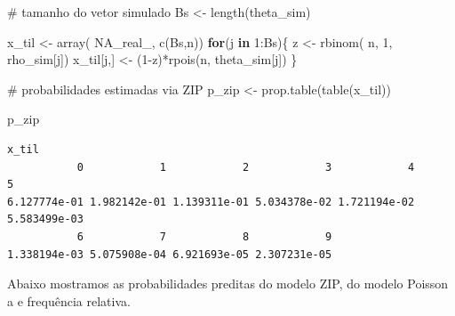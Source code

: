 \documentclass[
  letterpaper,
  DIV=11,
  numbers=noendperiod]{scrreprt}
\newenvironment{Shaded}{\begin{snugshade}}{\end{snugshade}}
\newcommand{\CommentTok}[1]{\textcolor[rgb]{0.37,0.37,0.37}{#1}}
\newcommand{\ConstantTok}[1]{\textcolor[rgb]{0.56,0.35,0.01}{#1}}
\newcommand{\ControlFlowTok}[1]{\textcolor[rgb]{0.00,0.23,0.31}{\textbf{#1}}}
\newcommand{\DecValTok}[1]{\textcolor[rgb]{0.68,0.00,0.00}{#1}}
\newcommand{\FunctionTok}[1]{\textcolor[rgb]{0.28,0.35,0.67}{#1}}
\newcommand{\NormalTok}[1]{\textcolor[rgb]{0.00,0.23,0.31}{#1}}
\newcommand{\OtherTok}[1]{\textcolor[rgb]{0.00,0.23,0.31}{#1}}
\newcommand{\SpecialCharTok}[1]{\textcolor[rgb]{0.37,0.37,0.37}{#1}}
\theoremstyle{definition}
\theoremstyle{definition}
\theoremstyle{plain}
\theoremstyle{remark}
\begin{document}
\begin{Shaded}
\begin{Highlighting}[]
\CommentTok{\# tamanho do vetor simulado}
\NormalTok{Bs }\OtherTok{\textless{}{-}} \FunctionTok{length}\NormalTok{(theta\_sim)}

\NormalTok{x\_til }\OtherTok{\textless{}{-}} \FunctionTok{array}\NormalTok{( }\ConstantTok{NA\_real\_}\NormalTok{, }\FunctionTok{c}\NormalTok{(Bs,n))}
\ControlFlowTok{for}\NormalTok{(j }\ControlFlowTok{in} \DecValTok{1}\SpecialCharTok{:}\NormalTok{Bs)\{}
\NormalTok{  z }\OtherTok{\textless{}{-}} \FunctionTok{rbinom}\NormalTok{( n, }\DecValTok{1}\NormalTok{, rho\_sim[j])}
\NormalTok{  x\_til[j,] }\OtherTok{\textless{}{-}}\NormalTok{ (}\DecValTok{1}\SpecialCharTok{{-}}\NormalTok{z)}\SpecialCharTok{*}\FunctionTok{rpois}\NormalTok{(n, theta\_sim[j])}
\NormalTok{\}}

\CommentTok{\# probabilidades estimadas via ZIP}
\NormalTok{p\_zip }\OtherTok{\textless{}{-}} \FunctionTok{prop.table}\NormalTok{(}\FunctionTok{table}\NormalTok{(x\_til))}

\NormalTok{p\_zip}
\end{Highlighting}
\end{Shaded}

\begin{verbatim}
x_til
           0            1            2            3            4            5 
6.127774e-01 1.982142e-01 1.139311e-01 5.034378e-02 1.721194e-02 5.583499e-03 
           6            7            8            9 
1.338194e-03 5.075908e-04 6.921693e-05 2.307231e-05 
\end{verbatim}

Abaixo mostramos as probabilidades preditas do modelo ZIP, do modelo
Poisson a e frequência relativa.
\end{document}
